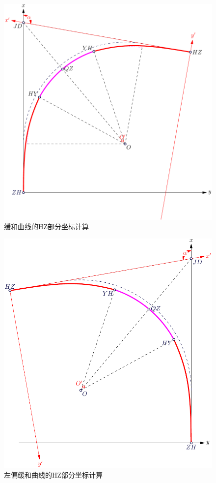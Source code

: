 \begin{enumerate}
\begin{figure}[htbp]
    \centering
    \includegraphics[scale=0.7]{chapter/route/RHY.pdf}
    \caption{缓和曲线的HZ部分坐标计算}
    \label{fig:RHY}
\end{figure}

\begin{figure}[htbp]
    \centering
    \includegraphics[scale=0.7]{chapter/route/LeftRHY.pdf}
    \caption{左偏缓和曲线的HZ部分坐标计算}
    \label{fig:LeftRHY}
\end{figure}


\end{enumerate}
